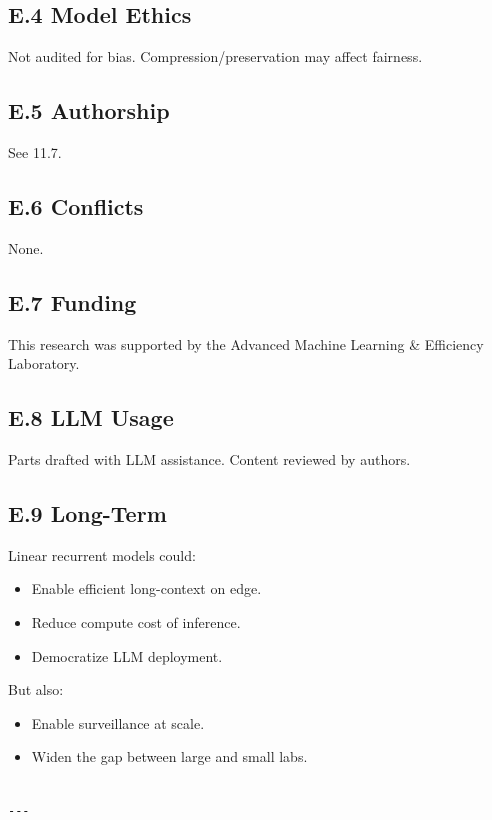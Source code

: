 \subsection{E.4 Model Ethics}

Not audited for bias. Compression/preservation may affect fairness.

\subsection{E.5 Authorship}

See  11.7.

\subsection{E.6 Conflicts}

None.

\subsection{E.7 Funding}

This research was supported by the Advanced Machine Learning \& Efficiency Laboratory.

\subsection{E.8 LLM Usage}

Parts drafted with LLM assistance. Content reviewed by authors.

\subsection{E.9 Long-Term}

Linear recurrent models could:
\begin{itemize}
\item Enable efficient long-context on edge.
\item Reduce compute cost of inference.
\item Democratize LLM deployment.

\end{itemize}
But also:
\begin{itemize}
\item Enable surveillance at scale.
\item Widen the gap between large and small labs.
\end{itemize}
\begin{lstlisting}

---
\end{lstlisting}